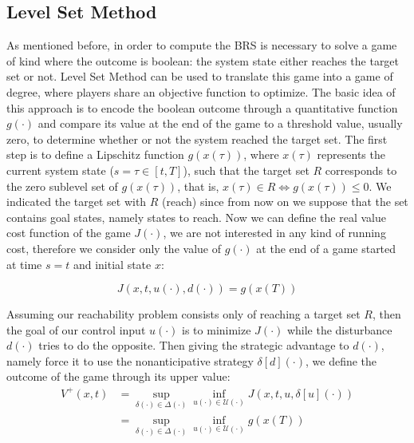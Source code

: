 \subsection{Level Set Method}
As mentioned before, in order to compute the BRS is necessary to solve a game of kind where the outcome is boolean: the system state either reaches the target set or not. Level Set Method can be used to translate this game into a game of degree, where players share an objective function to optimize. The basic idea of this approach is to encode the boolean outcome through a quantitative function $g(\cdot)$ and compare its value at the end of the game to a threshold value, usually zero, to determine whether or not the system reached the target set.
The first step is to define a Lipschitz function $g(x(\tau))$, where $x(\tau)$ represents the current system state ($s=\tau\in[t, T]$), such that the target set $R$ corresponds to the zero sublevel set of $g(x(\tau))$, that is, $x(\tau)\in R \Leftrightarrow g(x(\tau)) \leq 0$. We indicated the target set with $R$ (reach) since from now on we suppose that the set contains goal states, namely states to reach. Now we can define the real value cost function of the game $J(\cdot)$, we are not interested in any kind of running cost, therefore we consider only the value of $g(\cdot)$ at the end of a game started at time $s=t$ and initial state $x$:

\begin{equation}
\label{eq:j_level_set}
    J(x, t, u(\cdot), d(\cdot)) = g(x(T))
\end{equation}

Assuming our reachability problem consists only of reaching a target set $R$, then the goal of our control input $u(\cdot)$ is to minimize $J(\cdot)$ while the disturbance $d(\cdot)$ tries to do the opposite. Then giving the strategic advantage to $d(\cdot)$, namely force it to use the nonanticipative strategy $\delta[d](\cdot)$, we define the outcome of the game through its upper value:
\begin{equation}
	\begin{split}
		V^+(x, t) 
		& = \sup_{\delta(\cdot) \in \Delta(\cdot)}\inf_{u(\cdot) \in \mathcal{U}(\cdot)} J(x,t, u, \delta[u](\cdot))    \\
		& = \sup_{\delta(\cdot) \in \Delta(\cdot)}\inf_{u(\cdot) \in \mathcal{U}(\cdot)} g(x(T))
	\end{split}
\end{equation}

